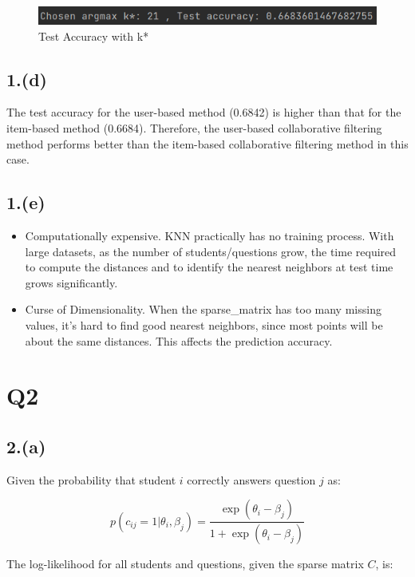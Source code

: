 \documentclass{article}
\begin{document}
\begin{figure}[H]
    \centering
    \includegraphics[width=\textwidth]{knn_impute_by_item_test.png}
    \caption{Test Accuracy with k*}
\end{figure}

\subsection*{1.(d)}
The test accuracy for the user-based method (0.6842) is higher than that for the item-based method (0.6684). Therefore, the user-based collaborative filtering method performs better than the item-based collaborative filtering method in this case.

\subsection*{1.(e)}
\begin{itemize}
    \item Computationally expensive. KNN practically has no training process. With large datasets, as the number of students/questions grow, the time required to compute the distances and to identify the nearest neighbors at test time grows significantly.
    \item Curse of Dimensionality. When the sparse\_matrix has too many missing values, it’s hard to find good nearest neighbors, since most points will be about the same distances. This affects the prediction accuracy.
\end{itemize}


\newpage
\section*{Q2}

\subsection*{2.(a)}

Given the probability that student $i$ correctly answers question $j$ as:

\[
p(c_{ij} = 1 | \theta_i, \beta_j) = \frac{\exp(\theta_i - \beta_j)}{1 + \exp(\theta_i - \beta_j)}
\]

The log-likelihood for all students and questions, given the sparse matrix $C$, is:
\end{document}
